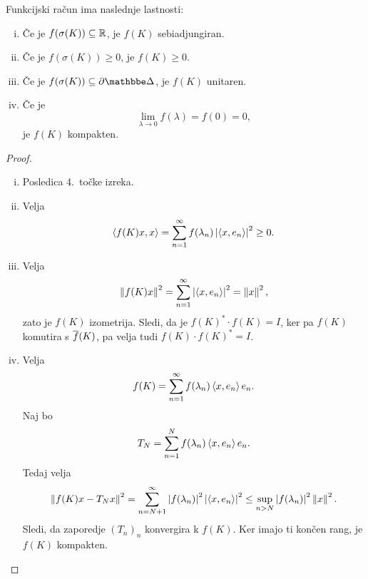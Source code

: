 \begin{trditev}
Funkcijski račun ima naslednje lastnosti:

\begin{enumerate}[i)]
\item Če je $f(\sigma(K)) \subseteq \mathbb{R}$, je $f(K)$ sebiadjungiran.
\item Če je $f(\sigma(K)) \geq 0$, je $f(K) \geq 0$.
\item Če je $f(\sigma(K)) \subseteq \partial \dsk$, je $f(K)$
unitaren.
\item Če je
\[
\lim_{\lambda \to 0} f(\lambda) = f(0) = 0,
\]
je $f(K)$ kompakten.
\end{enumerate}
\end{trditev}

\begin{proof}
\phantom{a}
\begin{enumerate}[i)]
\item Posledica 4.~točke izreka.
\item Velja
\[
\left\langle f(K) x, x\right\rangle =
\sum_{n=1}^\infty f(\lambda_n) \left\lvert \left\langle x, e_n\right\rangle\right\rvert^2 \geq
0.
\]
\item Velja
\[
\left\lVert f(K) x\right\rVert^2 =
\sum_{n=1}^\infty \left\lvert \left\langle x, e_n\right\rangle\right\rvert^2 =
\left\lVert x\right\rVert^2,
\]
zato je $f(K)$ izometrija. Sledi, da je $f(K)^* \cdot f(K) = I$,
ker pa $f(K)$ komutira s $\overline{f}(K)$, pa velja tudi
$f(K) \cdot f(K)^* = I$.
\item Velja
\[
f(K) = \sum_{n=1}^\infty f(\lambda_n) \left\langle x, e_n\right\rangle e_n.
\]
Naj bo
\[
T_N = \sum_{n=1}^N f(\lambda_n) \left\langle x, e_n\right\rangle e_n.
\]
Tedaj velja
\[
\left\lVert f(K) x - T_N x\right\rVert^2 =
\sum_{n=N+1}^\infty \left\lvert f(\lambda_n)\right\rvert^2 \left\lvert \left\langle x, e_n\right\rangle\right\rvert^2 \leq
\sup_{n > N} \left\lvert f(\lambda_n)\right\rvert^2 \left\lVert x\right\rVert^2.
\]
Sledi, da zaporedje $(T_n)_n$ konvergira k $f(K)$. Ker imajo ti
končen rang, je $f(K)$ kompakten. \qedhere
\end{enumerate}
\end{proof}

